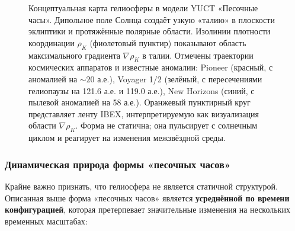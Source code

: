\documentclass[12pt,a4paper]{article}
\theoremstyle{remark}
\begin{document}
\begin{figure}[htbp]
		\caption{Концептуальная карта гелиосферы в модели YUCT «Песочные часы». Дипольное поле Солнца создаёт узкую «талию» в плоскости эклиптики и протяжённые полярные области. Изолинии плотности координации $\rho_K$ (фиолетовый пунктир) показывают область максимального градиента $\nabla\rho_K$ в талии. Отмечены траектории космических аппаратов и известные аномалии: Pioneer (красный, с аномалией на $\sim20$ а.е.), Voyager 1/2 (зелёный, с пересечениями гелиопаузы на 121.6 а.е. и 119.0 а.е.), New Horizons (синий, с пылевой аномалией на 58 а.е.). Оранжевый пунктирный круг представляет ленту IBEX, интерпретируемую как визуализация области $\nabla\rho_K$. Форма не статична; она пульсирует с солнечным циклом и реагирует на изменения межзвёздной среды.}
		\label{fig:coord:heliosphere_hourglass}
	\end{figure}
	
	\subsubsection{Динамическая природа формы «песочных часов»}
	\label{subsubsec:coord:dynamic}
	
	Крайне важно признать, что гелиосфера не является статичной структурой. Описанная выше форма «песочных часов» является \textbf{усреднённой по времени конфигурацией}, которая претерпевает значительные изменения на нескольких временных масштабах:
	
\end{document}
